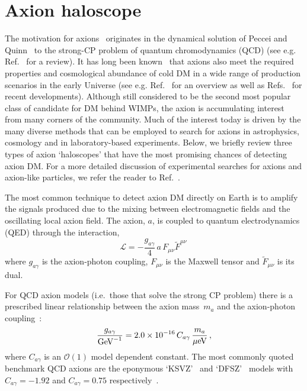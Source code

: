 \documentclass[prd,10pt,twocolumn,showpacs,nofootinbib,aps,superscriptaddress,preprintnumbers]{revtex4-1}
\begin{document}
\section{Axion haloscope}\label{sec:axions}
The motivation for axions~\cite{Weinberg:1977ma,Wilczek:1977pj} originates in the dynamical solution of Peccei and Quinn~\cite{Peccei:1977hh}
to the strong-CP problem of quantum chromodynamics (QCD) (see e.g. Ref.~\cite{Kim:2008hd} for a review). 
It has long been known~\cite{Preskill:1982cy,Abbott:1982af,Dine:1982ah} that axions also meet the required properties and cosmological abundance of cold DM in a wide range of production scenarios in the early Universe (see e.g. Ref.~\cite{Marsh:2015xka} for an overview as well as Refs.~\cite{Graham:2018jyp,Klaer:2017ond,Gorghetto:2018myk,Nelson:2018via,Guth:2018hsa,Visinelli:2018wza,Vaquero:2018tib} for recent developments).
Although still considered to be the second most popular class of candidate for DM behind WIMPs,
the axion is accumulating interest from many corners of the community. 
Much of the interest today is driven by the many diverse methods that can
be employed to search for axions in astrophysics, cosmology and
 in laboratory-based experiments. 
 Below, we briefly review three types of axion `haloscopes' that have the
 most promising chances of detecting axion DM.
For a more detailed discussion of experimental searches 
 for axions and axion-like particles, we refer the reader to Ref.~\cite{Irastorza:2018dyq}.

 
The most common technique to detect axion DM directly on Earth 
is to amplify the signals produced due to the mixing between 
electromagnetic fields and the oscillating local axion field. 
The axion, $a$, is coupled to quantum electrodynamics (QED) through the interaction,
\begin{equation}\label{eq:axionlagrangian}
\mathcal{L} = -\frac{g_{a\gamma}}{4} \, a\, F_{\mu \nu} \tilde{F}^{\mu \nu} \, 
\end{equation}
where $g_{a\gamma}$ is the axion-photon coupling,  
$F_{\mu \nu}$ is the Maxwell tensor 
and $\tilde{F}_{\mu \nu}$ is its dual.

For QCD axion models (i.e.\ those that solve the strong CP problem) 
there is a prescribed linear relationship between the axion mass~$m_a$ 
and the axion-photon coupling~\cite{Kaplan:1985dv,Srednicki:1985xd}:
\begin{equation}\label{eq:axioncoupling}
\frac{g_{a\gamma}}{{\rm GeV}^{-1}} = 2.0\times10^{-16}\, C_{a\gamma}\, \frac{m_a}{\mu {\rm eV}} \, ,
\end{equation} 
where $C_{a\gamma}$ is an $\mathcal{O}(1)$ model dependent constant. 
The most commonly quoted benchmark QCD axions are the eponymous 
`KSVZ'~\cite{Kim:1979if,Shifman:1979if} and `DFSZ'~\cite{Dine:1981rt,Zhitnitsky:1980tq} models with $C_{a\gamma} = -1.92$ and $C_{a\gamma} = 0.75$ respectively~\cite{diCortona:2015ldu}. 
\end{document}
